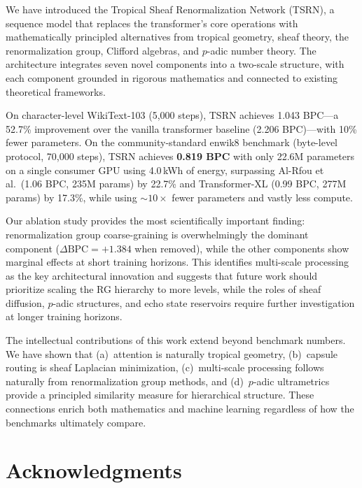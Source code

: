 \documentclass[11pt,a4paper]{article}
\begin{document}
We have introduced the Tropical Sheaf Renormalization Network (TSRN),
a sequence model that replaces the transformer's core operations with
mathematically principled alternatives from tropical geometry, sheaf
theory, the renormalization group, Clifford algebras, and $p$-adic
number theory.  The architecture integrates seven novel components
into a two-scale structure, with each component grounded in rigorous
mathematics and connected to existing theoretical frameworks.

On character-level WikiText-103 (5{,}000 steps), TSRN achieves
1.043 BPC---a 52.7\% improvement over the vanilla transformer
baseline (2.206 BPC)---with 10\% fewer parameters.  On the
community-standard enwik8 benchmark (byte-level protocol, 70{,}000
steps), TSRN achieves \textbf{0.819 BPC} with only 22.6M
parameters on a single consumer GPU using 4.0\,kWh of energy,
surpassing Al-Rfou et al.\ (1.06 BPC, 235M params) by 22.7\% and
Transformer-XL (0.99 BPC, 277M params) by 17.3\%, while using
$\sim\!10\times$ fewer parameters and vastly less compute.

Our ablation study provides the most scientifically important finding:
renormalization group coarse-graining is overwhelmingly the dominant
component ($\Delta\text{BPC} = +1.384$ when removed), while the
other components show marginal effects at short training horizons.
This identifies multi-scale processing as the key architectural
innovation and suggests that future work should prioritize scaling
the RG hierarchy to more levels, while the roles of sheaf diffusion,
$p$-adic structures, and echo state reservoirs require further
investigation at longer training horizons.

The intellectual contributions of this work extend beyond benchmark
numbers.  We have shown that (a)~attention is naturally tropical
geometry, (b)~capsule routing is sheaf Laplacian minimization,
(c)~multi-scale processing follows naturally from renormalization
group methods, and (d)~$p$-adic ultrametrics provide a principled
similarity measure for hierarchical structure.  These connections
enrich both mathematics and machine learning regardless of how the
benchmarks ultimately compare.


\section*{Acknowledgments}
\end{document}
